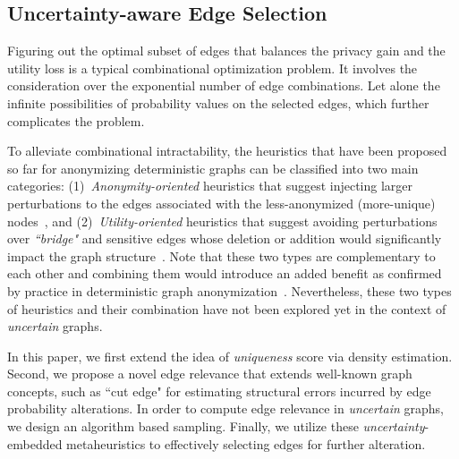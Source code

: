 \subsection{Uncertainty-aware Edge Selection}
Figuring out the optimal subset of edges that balances the privacy gain and the utility loss is a typical combinational optimization problem. It involves the consideration over the exponential number of edge combinations. Let alone the infinite possibilities of probability values on the selected edges, which further complicates the problem.

To alleviate combinational intractability, the heuristics that have been proposed so far for anonymizing deterministic graphs can be classified into two main categories: 
(1)~{\em Anonymity-oriented} heuristics that suggest injecting larger perturbations to the edges associated with the less-anonymized (more-unique) 
nodes~\cite{Boldi_Injecting_2012,Ying2009,Liu_Towards_2008, Thompson_The_2009,Zhou_Preserving_2008,casasprivacy,Ying_Randomizing_2008,Wang2011,Das_Anonymizing_2010,Wu_k_2010,Liu_Privacy_2009,Ninggal_Utility_2015}, and 
(2)~{\em Utility-oriented} heuristics that suggest avoiding perturbations over {\em ``bridge"} and sensitive edges whose deletion or addition would 
significantly impact the graph structure~\cite{casasprivacy,Ying_Randomizing_2008,Wang2011,Das_Anonymizing_2010,Wu_k_2010,Liu_Privacy_2009,Ninggal_Utility_2015}.
Note that these two types are complementary to each other and combining them would introduce an added benefit as confirmed by practice in deterministic graph anonymization~\cite{casasprivacy}. Nevertheless, these two types of heuristics and their combination have not been explored yet in the context of \emph{uncertain} graphs.

In this paper, we first extend the idea of \emph{uniqueness} score via density estimation. Second, we propose a novel edge relevance that extends well-known graph concepts, such as ``cut edge" for estimating structural errors incurred by edge probability alterations. In order to compute edge relevance in \emph{uncertain} graphs, we design an algorithm based sampling. Finally, we utilize these \emph{uncertainty}-embedded metaheuristics to effectively selecting edges for further alteration. 

